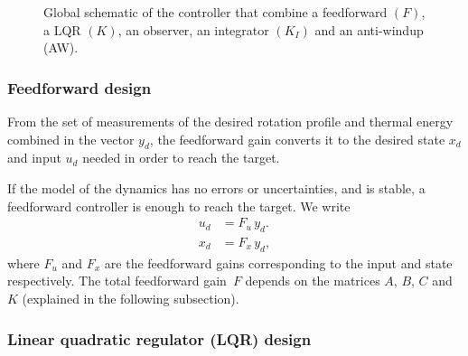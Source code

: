 \documentclass[12pt,lot, lof]{puthesis}
\begin{document}
\begin{figure}
\caption{Global schematic of the controller that combine a feedforward $(F)$, a LQR $(K)$, an observer, an integrator $(K_I)$ and an anti-windup (AW).}
\label{fig:model1}
\end{figure}

\subsubsection{Feedforward design} 
From the set of measurements of the desired rotation profile and thermal energy combined in the vector $y_d$, the feedforward gain converts it to the desired state $x_d$ and input $u_d$ needed in order to reach the target.

If the model of the dynamics has no errors or uncertainties, and is stable, a feedforward controller is enough to reach the target. We write
\begin{align}
   u_d &= F_u  \, y_d. \\
   x_d &= F_x  \,  y_d, 
\end{align}
where $ F_u$ and $ F_x $ are the feedforward gains corresponding  to the input and state respectively.
The total feedforward gain~$F$  depends on the matrices $A$, $B$, $C$ and $K$ (explained in the following subsection).
    
\subsubsection{Linear quadratic regulator (LQR) design} 
\end{document}
